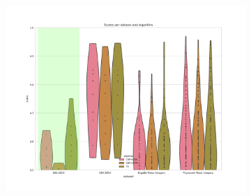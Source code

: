 \begin{figure}
    \centering
    \begin{subfigure}[t]{\textwidth}
        \centering
        \includegraphics[width=\textwidth]{CrossSubjectEvaluation_C3C4/scores.pdf}
    \end{subfigure}%
     

\end{figure}
